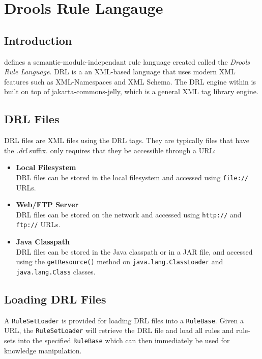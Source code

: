 \chapter{Drools Rule Langauge}

\section{Introduction}

\drools{} defines a semantic-module-independant rule language created 
called the \emph{Drools Rule Language}.  DRL is a an XML-based
language that uses modern XML features such as XML-Namespaces and XML
Schema. The DRL engine within \drools{} is built on top of
jakarta-commons-jelly, which is a general XML tag library
engine. 

\section{DRL Files}

DRL files are XML files using the DRL tags. They are typically files
that have the \emph{.drl} suffix.  \drools{} only requires that they
be accessible through a URL:

\begin{itemize}
	\item \textbf{\textsf{Local Filesystem}} \\
		DRL files can be stored in the local filesystem and
		accessed using \verb|file://| URLs.
	\item \textbf{\textsf{Web/FTP Server}} \\
		DRL files can be stored on the network and
		accessed using \verb|http://| and \verb|ftp://| URLs.
	\item \textbf{\textsf{Java Classpath}} \\
		DRL files can be stored in the Java classpath or in a JAR
		file, and accessed using the \verb|getResource()| method
		on \verb|java.lang.ClassLoader| and \verb|java.lang.Class|
		classes.
\end{itemize}

\section{Loading DRL Files}

A \verb|RuleSetLoader| is provided for loading DRL files into a
\verb|RuleBase|.  Given a URL, the \verb|RuleSetLoader| will retrieve
the DRL file and load all rules and rule-sets into the specified
\verb|RuleBase| which can then immediately be used for knowledge
manipulation.

